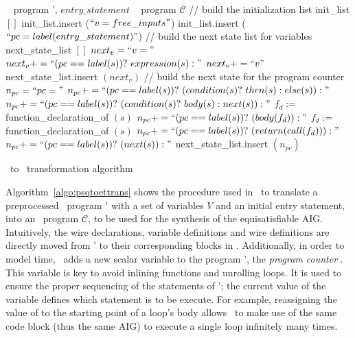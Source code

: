\begin{algorithm}[tb]
\begin{algorithmic}[1]
 \psqlanguage~ program \Pm', $entry\_statement$
 \thislanguage~ program $\mathcal{C}$
\State 
\State // build the initialization list
\State init\_list $[ ]$
  \State init\_list.insert ($``v = free\_inputs"$)
 \EndIf
\EndFor
\State init\_list.insert ($``pc = label(entry\_statement)"$)
\State
\State // build the next state list for variables
\State next\_state\_list $[ ]$
 \State $next_v = ``v = "$
  \State $next_v += ``(pc==label(s))? ~expression(s) : "$
 \EndFor
 \State $next_v += ``v"$
 \State next\_state\_list.insert $(next_v)$
\EndFor
\State 
\State // build the next state for the program counter
\State $n_{pc} = ``pc = "$
   \State $n_{pc} += ``(pc==label(s))?~ (condition(s)?~then(s) : else(s)) :"$
   \State $n_{pc} += ``(pc==label(s))?~ (condition(s)?~body(s):next(s)) :"$ 
   \State $f_d :=$ function\_declaration\_of $(s)$
   \State $n_{pc} += ``(pc==label(s))?~ (body(f_d)) :"$
   \State $f_d :=$ function\_declaration\_of $(s)$
   \State $n_{pc} += ``(pc==label(s))?~(return(call(f_d))) :"$
 \Else 
   \State $n_{pc} += ``(pc==label(s))?~(next(s)) :"$
 \EndIf
\EndFor
\State next\_state\_list.insert $(n_{pc})$
\end{algorithmic}
\caption{\psqlanguage~to \thislanguage~transformation algorithm}
\label{algo:psqtoettrans}
\end{algorithm}

Algorithm~\ref{algo:psqtoettrans} shows the procedure used 
in \mytool~to translate a preprocessed \psqlanguage~program \Pm'
with a set of variables $V$ and an initial entry statement, into an \thislanguage~program 
$\mathcal{C}$, to be used for the synthesis of the equisatisfiable 
AIG. Intuitively, the wire declarations, variable definitions and wire definitions are directly moved from 
 \Pm' to their corresponding blocks in \aigcircuit.
Additionally, in order to model time, \mytool~adds a new
scalar variable to the program \Pm', the {\em program
counter} . This variable is key to avoid 
inlining functions and unrolling loops. It is used to 
ensure the proper sequencing of the statements of \Pm';
the current value of the  variable defines which 
statement is to be execute. For example, reassigning the 
value of  to the starting point of a loop's body
allows \mytool~to make use of the same code block (thus
the same AIG) to execute a single loop infinitely many 
times. 

